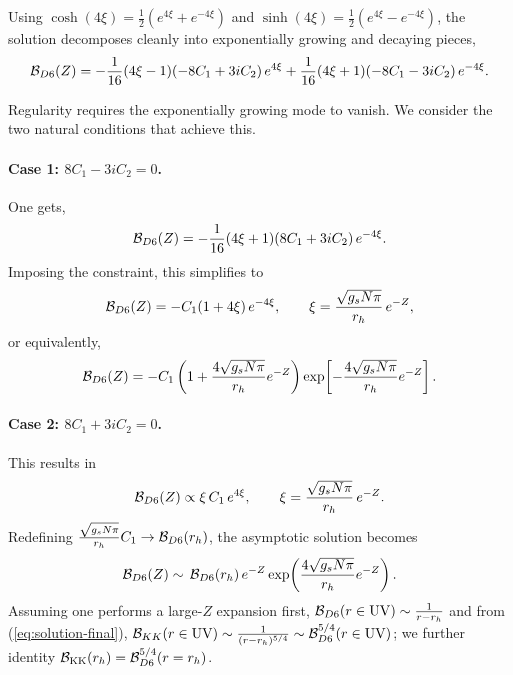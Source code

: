 \documentclass[a4paper,11pt,fleqn]{article}
\theoremstyle{plain}
\theoremstyle{definition}
\begin{document}
Using $\cosh(4\xi)=\tfrac12(e^{4\xi}+e^{-4\xi})$ and $\sinh(4\xi)=\tfrac12(e^{4\xi}-e^{-4\xi})$, the solution decomposes cleanly into exponentially growing and decaying pieces,
\begin{equation}
{\cal B}_{D6}(Z)
=
-\frac{1}{16}(4\xi-1)(-8C_1+3iC_2)\,e^{4\xi}
+\frac{1}{16}(4\xi+1)(-8C_1-3iC_2)\,e^{-4\xi}.
\end{equation}

Regularity requires the exponentially growing mode to vanish. We consider the two natural conditions that achieve this.

\paragraph{Case 1: $8C_1-3iC_2=0$.} 
One gets,
\begin{equation}
{\cal B}_{D6}(Z)
=
-\frac{1}{16}(4\xi+1)(8C_1+3iC_2)\,e^{-4\xi}.
\end{equation}
Imposing the constraint, this simplifies to
\begin{equation}
{\cal B}_{D6}(Z)
=
-C_1(1+4\xi)\,e^{-4\xi},
\qquad
\xi=\frac{\sqrt{g_sN\pi}}{r_h}\,e^{-Z},
\end{equation}
or equivalently,
\begin{equation}
{\cal B}_{D6}(Z)
=
-C_1
\left(
1+\frac{4\sqrt{g_sN\pi}}{r_h}e^{-Z}
\right)
\exp\!\left[
-\frac{4\sqrt{g_sN\pi}}{r_h}e^{-Z}
\right].
\end{equation}

\paragraph{Case 2: $8C_1+3iC_2=0$.}
This results in
\begin{equation}
{\cal B}_{D6}(Z)\propto \xi\,C_1\,e^{4\xi},
\qquad
\xi=\frac{\sqrt{g_sN\pi}}{r_h}\,e^{-Z}.
\end{equation}
Redefining $\frac{\sqrt{g_sN\pi}}{r_h}C_1\to {\cal B}_{D6}(r_h)$, the asymptotic solution becomes
\begin{equation}
{\cal B}_{D6}(Z)\sim
\, {\cal B}_{D6}(r_h)\,e^{-Z}
\exp\!\left(
\frac{4\sqrt{g_sN\pi}}{r_h}e^{-Z}
\right).
\label{BD6-UV}
\end{equation}
Assuming one performs a large-$Z$ expansion first, ${\cal B}_{D6}(r\in{\rm UV})\sim\frac{1}{r - r_h}$ and from (\ref{eq:solution-final}), ${\cal B}_{KK}(r\in{\rm UV})\sim\frac{1}{(r - r_h)^{5/4}}\sim{\cal B}_{D6}^{5/4}(r\in{\rm UV})$; we further identity  ${\cal B}_{\rm KK}(r_h) = {\cal B}_{D6}^{5/4}(r=r_h)$.
\end{document}
